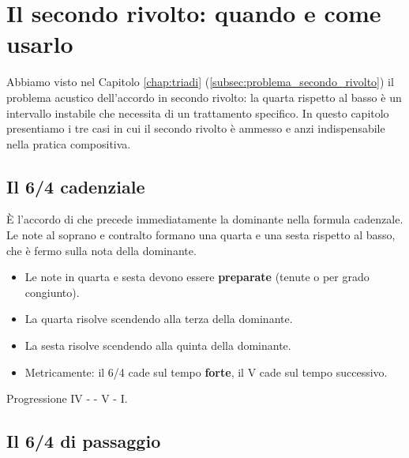 \chapter{Il secondo rivolto: quando e come usarlo}
\label{chap:quarta_sesta}

Abbiamo visto nel Capitolo \ref{chap:triadi} (\ref{subsec:problema_secondo_rivolto}) il problema acustico dell'accordo in secondo rivolto: la quarta rispetto al basso è un intervallo instabile che necessita di un trattamento specifico. In questo capitolo presentiamo i tre casi in cui il secondo rivolto è ammesso e anzi indispensabile nella pratica compositiva.

\section{Il 6/4 cadenziale}
\label{sec:cadenziale}

\begin{definizione}[6/4 cadenziale]
    È l'accordo di  che precede immediatamente la dominante nella formula cadenzale. Le note al soprano e contralto formano una quarta e una sesta rispetto al basso, che è fermo sulla nota della dominante.
\end{definizione}

\begin{regola}
    \begin{itemize}
        \item Le note in quarta e sesta devono essere \textbf{preparate} (tenute o per grado congiunto).
        \item La quarta risolve scendendo alla terza della dominante.
        \item La sesta risolve scendendo alla quinta della dominante.
        \item Metricamente: il 6/4 cade sul tempo \textbf{forte}, il V cade sul tempo successivo.
    \end{itemize}
\end{regola}

\begin{esempio}
    Progressione IV -  - V - I.

\end{esempio}

\section{Il 6/4 di passaggio}
\label{sec:64_passaggio}

